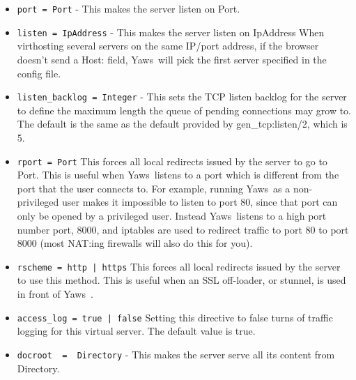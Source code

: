 \documentclass[11pt,oneside,english]{book}
\newcommand{\Yaws}            %
        {{\sc Yaws}}
\begin{document}
\begin{itemize}




\item       \verb+port = Port+ -
              This makes the server listen on Port.

\item        \verb+listen = IpAddress+ -
              This makes the  server  listen  on  IpAddress  When
              virthosting  several  servers  on  the same IP/port
              address, if the browser doesn't send a Host: field,
              \Yaws\   will  pick  the first server specified in the
              config file.

\item        \verb+listen_backlog = Integer+ -
              This sets the TCP listen backlog for the server to
              define the maximum length the queue of pending
              connections may grow to. The default is the same as
              the default provided by gen\_tcp:listen/2, which is 5.

\item       \verb+rport = Port+
              This forces  all  local  redirects  issued  by  the
              server  to  go  to  Port.  This is useful when \Yaws\
              listens to a port which is different from the  port
              that  the  user  connects  to. For example, running
              \Yaws\  as a non-privileged user makes  it  impossible
              to  listen  to port 80, since that port can only be
              opened by a privileged user. Instead  \Yaws\   listens
              to  a high port number port, 8000, and iptables are
              used to redirect traffic to port 80  to  port  8000
              (most NAT:ing firewalls will also do this for you).

\item       \verb+rscheme = http | https+
              This forces  all  local  redirects  issued  by  the
              server  to  use this method. This is useful when an
              SSL off-loader, or stunnel, is  used  in  front  of
              \Yaws\ .

\item       \verb+access_log = true | false+
              Setting  this  directive  to  false turns of
              traffic logging for this virtual server. The
              default value is true.

\item       \verb+docroot  =  Directory+ -
              This makes the server serve all its content from
              Directory.


\end{itemize}
\end{document}
